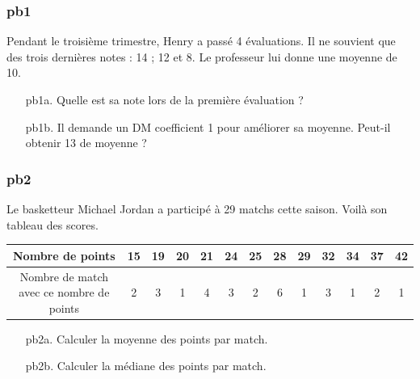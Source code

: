 \subsubsection*{pb1}

Pendant le troisième trimestre, Henry a passé 4 évaluations. Il ne souvient que des trois dernières notes : 14 ; 12 et 8. Le professeur lui donne une moyenne de 10. 

\begin{enumerate}
  \item[pb1a.] Quelle est sa note lors de la première évaluation ? 
  \item[pb1b.] Il demande un DM coefficient 1 pour améliorer sa moyenne. Peut-il obtenir 13 de moyenne ?
\end{enumerate}

\Pointilles[8]

\subsubsection*{pb2}

Le basketteur Michael Jordan a participé à 29 matchs cette saison. Voilà son tableau des scores.

\begin{tabular}{|c|c|c|c|c|c|c|c|c|c|c|c|c|}
  \hline
  Nombre de points                         & 15 & 19 & 20 & 21 & 24 & 25 & 28 & 29 & 32 & 34 & 37 & 42 \\ \hline

  Nombre de match avec ce nombre de points & 2  & 3  & 1  & 4  &  3 & 2  & 6  & 1  & 3  & 1  & 2  & 1  \\ \hline
\end{tabular}

\begin{enumerate}
  \item[pb2a.] Calculer la moyenne des points par match.
  \item[pb2b.] Calculer la médiane des points par match.
\end{enumerate}

\Pointilles[8]



